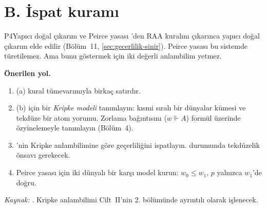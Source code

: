 \section{B. İspat kuramı}\label{sec:projeler-b}

\begin{projekarti}{P4}{Yapıcı doğal çıkarım ve Peirce yasası}
'den RAA kuralını çıkarınca yapıcı doğal çıkarım elde edilir
(Bölüm~11, \cref{sec:gecerlilik-sinir}). Peirce yasası bu sistemde
türetilemez. Ama bunu göstermek için iki değerli anlambilim yetmez.


\textbf{Önerilen yol.}
\begin{enumerate}[nosep]
  \item (a) kural tümevarımıyla birkaç satırdır.
  \item (b) için bir \emph{Kripke modeli} tanımlayın: kısmi sıralı bir
        dünyalar kümesi ve tekdüze bir atom yorumu. Zorlama bağıntısını
        ($w \Vdash A$) formül üzerinde özyinelemeyle tanımlayın (Bölüm~4).
  \item {}'nin Kripke anlambilimine göre geçerliliğini ispatlayın.
         durumunda tekdüzelik önsavı gerekecek.
  \item Peirce yasası için iki dünyalı bir karşı model kurun:
        $w_0 \le w_1$, $p$ yalnızca $w_1$'de doğru.
\end{enumerate}
\emph{Kaynak:} \citet{kripke1965,troelstra1988}. Kripke anlambilimi
Cilt~II'nin 2. bölümünde ayrıntılı olarak işlenecek.
\end{projekarti}

